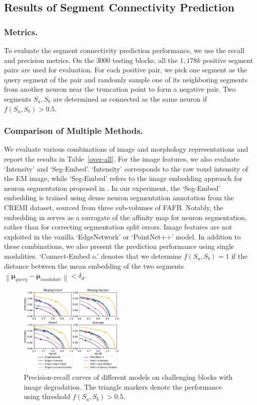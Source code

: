 \subsection{Results of Segment Connectivity Prediction}

\subsubsection{Metrics.} 
To evaluate the segment connectivity prediction performance, we use the recall and precision metrics. On the $3000$ testing blocks, all the $1,178k$ positive segment pairs are used for evaluation. For each positive pair, we pick one segment as the query segment of the pair and randomly sample one of its neighboring segments from another neuron near the truncation point to form a negative pair. 
Two segments $S_a, S_b$ are determined as connected as the same neuron if $f(S_a,S_b)>0.5$.

\subsubsection{Comparison of Multiple Methods.}
We evaluate various combinations of image and morphology representations and report the results in Table~\ref{over-all}.
For the image features, we also evaluate `Intensity' and `Seg-Embed'. `Intensity' corresponds to the raw voxel intensity of the EM image, while `Seg-Embed' refers to the image embedding approach for neuron segmentation proposed in \cite{lee2021learning}. 
In our experiment, the `Seg-Embed' embedding is trained using dense neuron segmentation annotation from the CREMI dataset, sourced from three sub-volumes of FAFB. Notably, the embedding in \cite{lee2021learning} serves as a surrogate of the affinity map for neuron segmentation, rather than for correcting segmentation split errors. 
Image features are not exploited in the vanilla `EdgeNetwork' or `PointNet++' model.
In addition to these combinations, we also present the prediction performance using single modalities. `Connect-Embed o.' denotes that we determine $f(S_a,S_b)=1$ if the distance between the mean embedding of the two segments $\left\|\bm{\mu}_{query}-\bm{\mu}_{candidate}\right\|<\delta_d$. 

\begin{figure}[t]
    \centering
    \includegraphics[width=0.45\textwidth]{figs/thresh.pdf}
    \caption{Precision-recall curves of different models on challenging blocks with image degradation. The triangle markers denote the performance using threshold $f(S_a,S_b)>0.5$. } 
    \label{thresh}
\end{figure}

